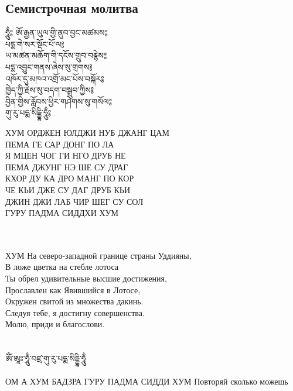 \subsection*{Семистрочная молитва}

\begingroup
\parbox[t][][l]{0.40\textwidth}{
\ti ཧཱུྃ༔ ཨོ་རྒྱན་ཡུལ་གྱི་ནུབ་བྱང་མཚམས༔\\
པདྨ་གེ་སར་སྡོང་པོ་ལ༔\\
ཡ་མཚན་མཆོག་གི་དངོས་གྲུབ་བརྙེས༔\\
པདྨ་འབྱུང་གནས་ཞེས་སུ་གྲགས༔\\
འཁོར་དུ་མཁའ་འགྲོ་མང་པོས་བསྐོར༔\\
ཁྱེད་ཀྱི་རྗེས་སུ་བདག་བསྒྲུབ་ཀྱིས༔\\
བྱིན་གྱིས་རློབས་ཕྱིར་གཤེགས་སུ་གསོལ༔\\
གུ་རུ་པདྨ་སིདྡྷི་ཧཱུྃ༔\\
\ru
}
\hspace{0.2cm}
\parbox[t][][r]{0.60\textwidth}{
\small
\vspace{0.1cm}
ХУМ ОРДЖЕН ЮЛДЖИ НУБ ДЖАНГ ЦАМ\\
ПЕМА ГЕ САР ДОНГ ПО ЛА\\
Я МЦЕН ЧОГ ГИ НГО ДРУБ НЕ\\
ПЕМА ДЖУНГ НЭ ШЕ СУ ДРАГ\\
КХОР ДУ КА ДРО МАНГ ПО КОР\\
ЧЕ КЬИ ДЖЕ СУ ДАГ ДРУБ КЬИ\\
ДЖИН ДЖИ ЛАБ ЧИР ШЕГ СУ СОЛ\\
ГУРУ ПАДМА СИДДХИ ХУМ\\
}
\endgroup
\\
\\
ХУМ На северо-западной границе страны Уддияны,\\
В ложе цветка на стебле лотоса\\
Ты обрел удивительные высшие достижения,\\
Прославлен как Явившийся в Лотосе,\\
Окружен свитой из множества дакинь.\\
Следуя тебе, я достигну совершенства.\\
Молю, приди и благослови.\\
\\
\\
\ti ཨོཾ་ཨཱཿ་ཧཱུྃ་བཛྲ་གུ་རུ་པདྨ་སིདྡྷི་ཧཱུྃ\\
\\
\ru ОМ А ХУМ БАДЗРА ГУРУ ПАДМА СИДДИ ХУМ
\scriptsize
Повторяй сколько можешь
\normalsize

